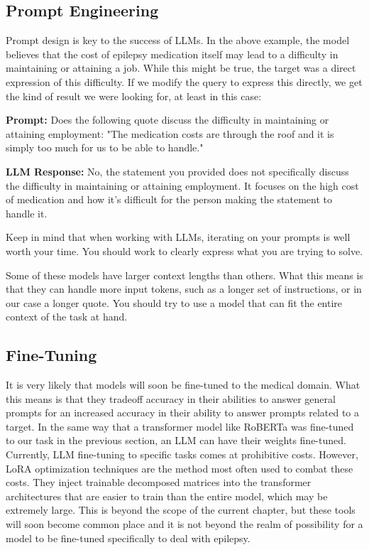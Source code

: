 \subsection{Prompt Engineering}

Prompt design is key to the success of LLMs. In the above example, the model believes that the cost of epilepsy medication itself may lead to a difficulty in maintaining or attaining a job. While this might be true, the target was a direct expression of this difficulty.
If we modify the query to express this directly, we get the kind of result we were looking for, at least in this case:

\begin{displayquote}
  \textbf{Prompt:} Does the following quote discuss the difficulty in maintaining or attaining employment: "The medication costs are through the roof and it is simply too much for us to be able to handle."
\end{displayquote}

\begin{displayquote}
  \textbf{LLM Response:} No, the statement you provided does not specifically discuss the difficulty in maintaining or attaining employment. It focuses on the high cost of medication and how it's difficult for the person making the statement to handle it.
\end{displayquote}

Keep in mind that when working with LLMs, iterating on your prompts is well worth your time. You should work to clearly express what you are trying to solve.

Some of these models have larger context lengths than others. What this means is that they can handle more input tokens, such as a longer set of instructions, or in our case a longer quote.
You should try to use a model that can fit the entire context of the task at hand.

\subsection{Fine-Tuning}

It is very likely that models will soon be fine-tuned to the medical domain. What this means is that they tradeoff accuracy in their abilities to answer general prompts for an increased accuracy in their ability to answer prompts related to a target.
In the same way that a transformer model like RoBERTa was fine-tuned to our task in the previous section, an LLM can have their weights fine-tuned.
Currently, LLM fine-tuning to specific tasks comes at prohibitive costs. However, LoRA\cite{hu2021lora} optimization techniques are the method most often used to combat these costs. They inject trainable decomposed matrices into the transformer architectures that
are easier to train than the entire model, which may be extremely large.
This is beyond the scope of the current chapter, but these tools will soon become common place and it is not beyond the realm of possibility for a model to be fine-tuned specifically to deal with
epilepsy.


